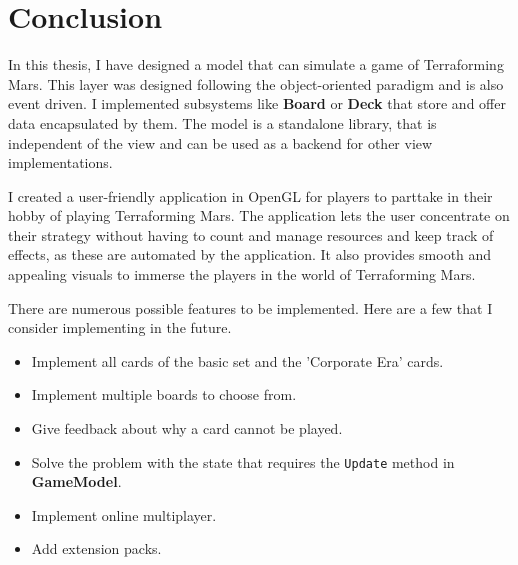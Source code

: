 \part{Conclusion}
\label{sum}

In this thesis, I have designed a model that can simulate a game of Terraforming Mars. This layer was designed following the object-oriented paradigm and is also event driven. I implemented subsystems like \textbf{Board} or \textbf{Deck} that store and offer data encapsulated by them. The model is a standalone library, that is independent of the view and can be used as a backend for other view implementations.

I created a user-friendly application in OpenGL for players to parttake in their hobby of playing Terraforming Mars. The application lets the user concentrate on their strategy without having to count and manage resources and keep track of effects, as these are automated by the application. It also provides smooth and appealing visuals to immerse the players in the world of Terraforming Mars.

There are numerous possible features to be implemented. Here are a few that I consider implementing in the future.
\begin{itemize}
    \item Implement all cards of the basic set and the 'Corporate Era' cards.
    \item Implement multiple boards to choose from.
    \item Give feedback about why a card cannot be played.
    \item Solve the problem with the state that requires the \texttt{Update} method in \textbf{GameModel}.
    \item Implement online multiplayer.
    \item Add extension packs.
\end{itemize}
